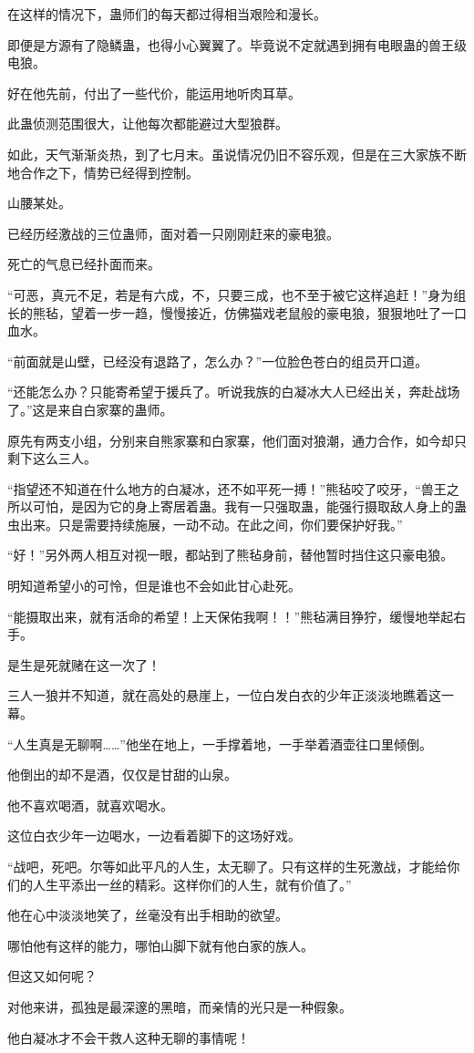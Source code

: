 \begin{this_body}
在这样的情况下，蛊师们的每天都过得相当艰险和漫长。

即便是方源有了隐鳞蛊，也得小心翼翼了。毕竟说不定就遇到拥有电眼蛊的兽王级电狼。

好在他先前，付出了一些代价，能运用地听肉耳草。

此蛊侦测范围很大，让他每次都能避过大型狼群。

如此，天气渐渐炎热，到了七月末。虽说情况仍旧不容乐观，但是在三大家族不断地合作之下，情势已经得到控制。

山腰某处。

已经历经激战的三位蛊师，面对着一只刚刚赶来的豪电狼。

死亡的气息已经扑面而来。

“可恶，真元不足，若是有六成，不，只要三成，也不至于被它这样追赶！”身为组长的熊毡，望着一步一趋，慢慢接近，仿佛猫戏老鼠般的豪电狼，狠狠地吐了一口血水。

“前面就是山壁，已经没有退路了，怎么办？”一位脸色苍白的组员开口道。

“还能怎么办？只能寄希望于援兵了。听说我族的白凝冰大人已经出关，奔赴战场了。”这是来自白家寨的蛊师。

原先有两支小组，分别来自熊家寨和白家寨，他们面对狼潮，通力合作，如今却只剩下这么三人。

“指望还不知道在什么地方的白凝冰，还不如平死一搏！”熊毡咬了咬牙，“兽王之所以可怕，是因为它的身上寄居着蛊。我有一只强取蛊，能强行摄取敌人身上的蛊虫出来。只是需要持续施展，一动不动。在此之间，你们要保护好我。”

“好！”另外两人相互对视一眼，都站到了熊毡身前，替他暂时挡住这只豪电狼。

明知道希望小的可怜，但是谁也不会如此甘心赴死。

“能摄取出来，就有活命的希望！上天保佑我啊！！”熊毡满目狰狞，缓慢地举起右手。

是生是死就赌在这一次了！

三人一狼并不知道，就在高处的悬崖上，一位白发白衣的少年正淡淡地瞧着这一幕。

“人生真是无聊啊……”他坐在地上，一手撑着地，一手举着酒壶往口里倾倒。

他倒出的却不是酒，仅仅是甘甜的山泉。

他不喜欢喝酒，就喜欢喝水。

这位白衣少年一边喝水，一边看着脚下的这场好戏。

“战吧，死吧。尔等如此平凡的人生，太无聊了。只有这样的生死激战，才能给你们的人生平添出一丝的精彩。这样你们的人生，就有价值了。”

他在心中淡淡地笑了，丝毫没有出手相助的欲望。

哪怕他有这样的能力，哪怕山脚下就有他白家的族人。

但这又如何呢？

对他来讲，孤独是最深邃的黑暗，而亲情的光只是一种假象。

他白凝冰才不会干救人这种无聊的事情呢！

\end{this_body}

